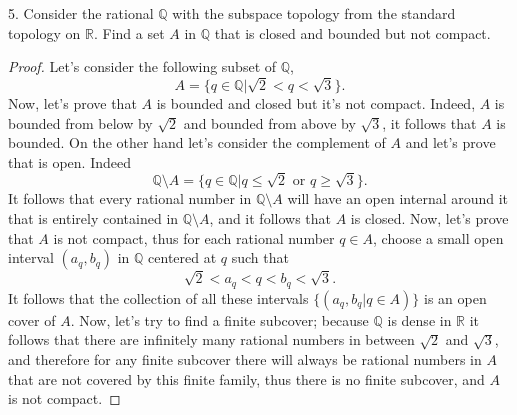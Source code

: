 \documentclass[11pt]{amsart}
\begin{document}
\newpage
\begin{tcolorbox}
5. Consider the rational $\mathbb{Q}$ with the subspace topology from the standard topology on $\mathbb{R}$. Find a set $A$ in
$\mathbb{Q}$ that is closed and bounded but not compact.
\end{tcolorbox}

\begin{proof}
Let's consider the following subset of $\mathbb{Q}$,
$$
A=\{ q\in\mathbb{Q} | \sqrt{2}<q<\sqrt{3} \}.
$$
Now, let's prove that $A$ is bounded and closed but it's not compact. Indeed, $A$ is bounded from below by $\sqrt{2}$ and bounded from above by $\sqrt{3}$, it follows that $A$ is bounded. On the other hand let's consider the complement of $A$ and let's prove that is open. Indeed
$$
\mathbb{Q}\setminus A = \{ q\in\mathbb{Q}|q\leq\sqrt{2} \text{ or } q\geq\sqrt{3} \}.
$$
It follows that every rational number in $\mathbb{Q}\setminus A$ will have an open internal around it that is entirely contained in $\mathbb{Q}\setminus A$, and it follows that $A$ is closed.
Now, let's prove that $A$ is not compact, thus for each rational number $q\in A$,  choose a small open interval $(a_{q},b_{q})$ in $\mathbb{Q}$ centered at $q$ such that 
$$
\sqrt{2}<a_{q}<q<b_{q}<\sqrt{3}.
$$
It follows that the collection of all these intervals $\{(a_{q},b_{q}|q\in A)\}$ is an open cover of $A$. Now, let's try to find a finite subcover; because $\mathbb{Q}$ is dense in $\mathbb{R}$ it follows that there are infinitely many rational numbers in between $\sqrt{2}$ and $\sqrt{3}$, and therefore for any finite subcover there will always be rational numbers in $A$ that are not covered by this finite family, thus there is no finite subcover, and $A$ is not compact.
\end{proof}
\end{document}
